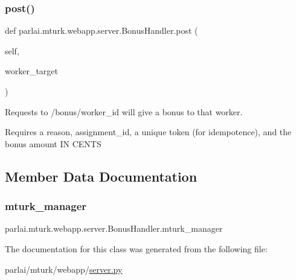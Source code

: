 \subsubsection{\texorpdfstring{post()}{post()}}
{\footnotesize\ttfamily def parlai.\+mturk.\+webapp.\+server.\+Bonus\+Handler.\+post (\begin{DoxyParamCaption}\item[{}]{self,  }\item[{}]{worker\+\_\+target }\end{DoxyParamCaption})}

\begin{DoxyVerb}Requests to /bonus/{worker_id} will give a bonus to that worker.

Requires a reason, assignment_id, a unique token (for idempotence), and the
bonus amount IN CENTS
\end{DoxyVerb}
 

\subsection{Member Data Documentation}
\mbox{\label{classparlai_1_1mturk_1_1webapp_1_1server_1_1BonusHandler_a9cfd41f9f9ca83eae4d3f8d5f54b8d03}} 
\subsubsection{\texorpdfstring{mturk\+\_\+manager}{mturk\_manager}}
{\footnotesize\ttfamily parlai.\+mturk.\+webapp.\+server.\+Bonus\+Handler.\+mturk\+\_\+manager}



The documentation for this class was generated from the following file\+:\begin{DoxyCompactItemize}
\item 
parlai/mturk/webapp/\hyperlink{server_8py}{server.\+py}\end{DoxyCompactItemize}
